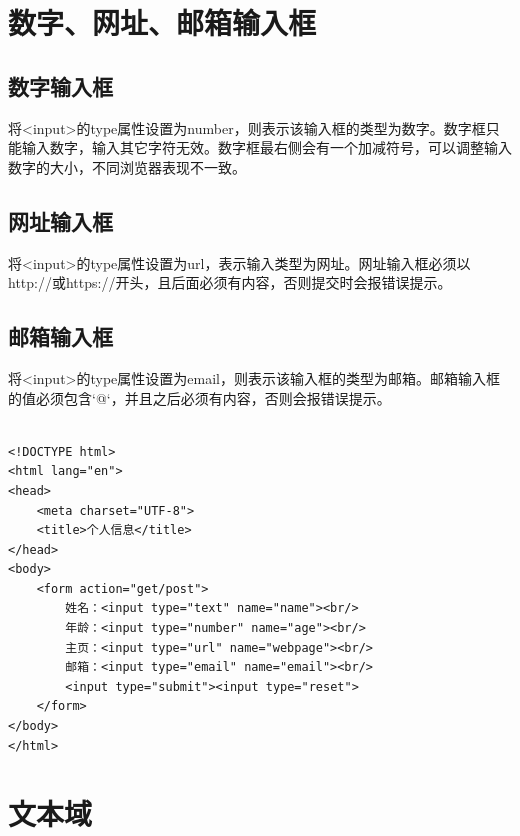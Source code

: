 \newpage

\section{数字、网址、邮箱输入框}

\subsection{数字输入框}

将<input>的type属性设置为number，则表示该输入框的类型为数字。数字框只能输入数字，输入其它字符无效。数字框最右侧会有一个加减符号，可以调整输入数字的大小，不同浏览器表现不一致。\\

\subsection{网址输入框}

将<input>的type属性设置为url，表示输入类型为网址。网址输入框必须以http://或https://开头，且后面必须有内容，否则提交时会报错误提示。\\

\subsection{邮箱输入框}

将<input>的type属性设置为email，则表示该输入框的类型为邮箱。邮箱输入框的值必须包含`@`，并且之后必须有内容，否则会报错误提示。\\

\\

\begin{lstlisting}[style=htmlcssjs]
<!DOCTYPE html>
<html lang="en">
<head>
    <meta charset="UTF-8">
    <title>个人信息</title>
</head>
<body>
    <form action="get/post">
        姓名：<input type="text" name="name"><br/>
        年龄：<input type="number" name="age"><br/>
        主页：<input type="url" name="webpage"><br/>
        邮箱：<input type="email" name="email"><br/>
        <input type="submit"><input type="reset">
    </form>
</body>
</html>
\end{lstlisting}

\newpage

\section{文本域}

